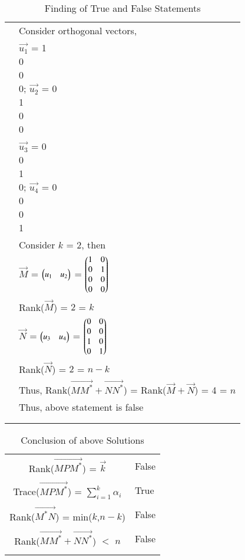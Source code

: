 \begin{longtable}{|c|l|}
	& Consider orthogonal vectors,\\
	& $\vec{u_1}$ = \myvec{1\\0\\0\\0}; $\vec{u_2}$ = \myvec{0\\1\\0\\0}\\
	& $\vec{u_3}$ = \myvec{0\\0\\1\\0}; $\vec{u_4}$ = \myvec{0\\0\\0\\1}\\
	& Consider $k$ = 2, then \\
	& $\vec{M}$ = $\begin{pmatrix}u_1&u_2\end{pmatrix}$ = $\begin{pmatrix}1&0\\0&1\\0&0\\0&0\end{pmatrix}$\\
	& Rank($\vec{M}$) = $2$ = $k$\\
	& $\vec{N}$ = $\begin{pmatrix}u_3&u_4\end{pmatrix}$ = $\begin{pmatrix}0&0\\0&0\\1&0\\0&1\end{pmatrix}$\\
	& Rank($\vec{N}$) = $2$ = $n-k$\\
	& Thus, Rank($\vec{M{M}^*}+\vec{N{N}^*}$) = Rank($\vec{M}+\vec{N}$) = 4 = $n$\\
	& Thus, above statement is false \\
	&\\
	\hline
	\caption{Finding of True and False Statements}
    \label{eq:solutions/2018/dec/31/table:2}
\end{longtable}
\begin{longtable}{|c|l|}
    \hline
	\multirow{3}{*}{Rank($\vec{MP{M}^*}$) = $\vec{k}$} 
	& \\
	& False \\
	&\\
	\hline
	\multirow{3}{*}{{Trace($\vec{MP{M}^*}$) = $\sum_{i=1}^{k}\alpha_i$}} 
	& \\
	& True \\
	& \\
	\hline
	\multirow{3}{*}{Rank($\vec{{M}^*N}$) = min($k$,$n-k$)} 
	& \\
	& False \\
	& \\
	\hline
	\multirow{3}{*}{Rank($\vec{M{M}^*}+\vec{N{N}^*}$) $<$ $n$} 
	& \\
	& False \\
	& \\
	\hline
	\caption{Conclusion of above Solutions}
    \label{eq:solutions/2018/dec/31/table:3}
\end{longtable}
\twocolumn
